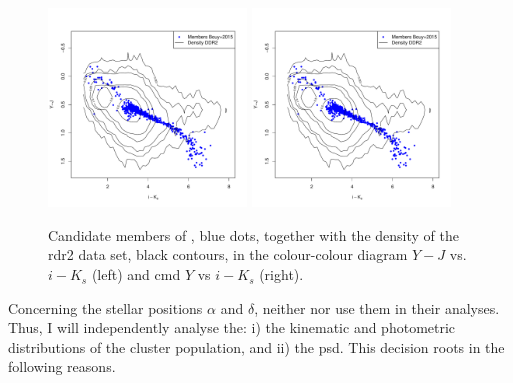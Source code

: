 \begin{figure}[htp!]
\begin{center}
\includegraphics[page=1,width=0.47\textwidth]{background/Figures/Y-J.pdf}
\includegraphics[page=2,width=0.47\textwidth]{background/Figures/Y-J.pdf}
\caption{Candidate members of \citet{Bouy2015}, blue dots, together with the density of the \gls{rdr2} data set, black contours, in the colour-colour  diagram $Y-J$ vs. $i-K_s$ (left) and \gls{cmd} $Y$ vs $i-K_s$ (right).}
\label{fig:Y-JvsY}
\end{center}
\end{figure}
 

Concerning the stellar positions $\alpha$ and $\delta$, neither \citet{Bouy2015} nor \citet{Sarro2014} use them in their analyses. Thus, I will independently analyse the: i) the kinematic and photometric distributions of the cluster population, and ii) the \gls{psd}. This decision roots in the following reasons.

